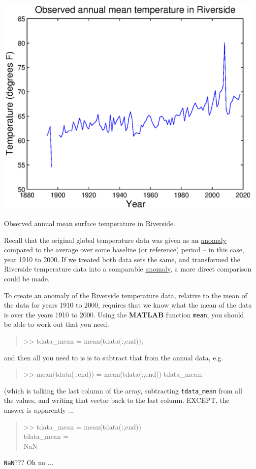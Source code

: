 \documentclass{tufte-book} %
\newenvironment{docspec}{\begin{quotation}\ttfamily\parskip0pt\parindent0pt\ignorespaces}{\end{quotation}}
\begin{document}
\begin{marginfigure}[-1.0in]
\includegraphics[width=\linewidth]{ch1-plot-temperature4.eps}
\caption{Observed annual mean surface temperature in Riverside.}
\label{fig:ch1-plot-temperature4}
\end{marginfigure}

Recall that the original global temperature data was given as an \uline{anomaly} compared to the average over some baseline (or reference) period -- in this case, year 1910 to 2000. If we treated both data sets the same, and transformed the Riverside temperature data into a comparable \uline{anomaly}, a more direct comparison could be made. 

To create an anomaly of the Riverside temperature data, relative to the mean of the data for years 1910 to 2000, requires that we know what the mean of the data is over the years 1910 to 2000. Using the \textbf{MATLAB} function \texttt{mean}, you should be able to work out that you need:
\begin{docspec}
>> tdata\_mean = mean(tdata(:,end));
\end{docspec}
and then all you need to is is to subtract that from the annual data, e.g.
\begin{docspec}
>> mean(tdata(:,end)) = mean(tdata(:,end))-tdata\_mean;
\end{docspec}
(which is talking the last column of the array, subtracting \texttt{tdata\_mean} from all the values, and writing that vector back to the last column. EXCEPT, the answer is apparently ...
\begin{docspec}
>> tdata\_mean = mean(tdata(:,end))\\
tdata\_mean = \\
NaN
\end{docspec}
\texttt{NaN}??? Oh no ...
\end{document}
